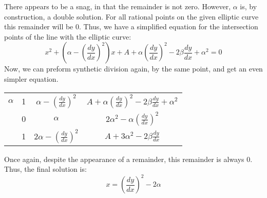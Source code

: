 \documentclass[12pt,letterpaper]{article}
\begin{document}
There appears to be a snag, in that the remainder is not zero. However, $\alpha$ is, by construction, a double solution. For all rational points on the given elliptic curve this remainder will be $0$. Thus, we have a simplified equation for the intersection points of the line with the elliptic curve:
$$x^2+\left(\alpha-\left(\frac{dy}{dx}\right)^2\right)x+A+\alpha\left(\frac{dy}{dx}\right)^2-2\beta\frac{dy}{dx}+\alpha^2=0$$
Now, we can preform synthetic division again, by the same point, and get an even simpler equation.
\begin{center}
  \begin{tabular} { c | c | c | c }
  $\alpha$ & 1 & $\alpha-\left(\frac{dy}{dx}\right)^2$ & $A+\alpha\left(\frac{dy}{dx}\right)^2-2\beta\frac{dy}{dx}+\alpha^2$ \\ 
  & 0 & $\alpha$ & $2\alpha^2-\alpha\left(\frac{dy}{dx}\right)^2$ \\
  \hline
  & 1 & $2\alpha-\left(\frac{dy}{dx}\right)^2$ & $A+3\alpha^2-2\beta\frac{dy}{dx}$ \\
  \end{tabular}
  \break
\end{center}
Once again, despite the appearance of a remainder, this remainder is always $0$.
Thus, the final solution is:
$$x=\left(\frac{dy}{dx}\right)^2-2\alpha$$
\end{document}

